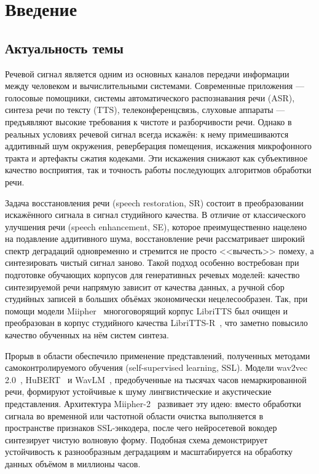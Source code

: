 \section{Введение}
\label{sec:Chapter0} 

\subsection{Актуальность темы}

Речевой сигнал является одним из основных каналов передачи информации между
человеком и вычислительными системами. Современные приложения --- голосовые
помощники, системы автоматического распознавания речи (ASR), синтеза речи по
тексту (TTS), телеконференцсвязь, слуховые аппараты --- предъявляют высокие
требования к чистоте и разборчивости речи. Однако в реальных условиях речевой
сигнал всегда искажён: к нему примешиваются аддитивный шум окружения,
реверберация помещения, искажения микрофонного тракта и артефакты сжатия
кодеками. Эти искажения снижают как субъективное качество восприятия, так и
точность работы последующих алгоритмов обработки речи.

Задача восстановления речи (speech restoration, SR) состоит в преобразовании
искажённого сигнала в сигнал студийного качества. В отличие от классического
улучшения речи (speech enhancement, SE), которое преимущественно нацелено на
подавление аддитивного шума, восстановление речи рассматривает широкий спектр
деградаций одновременно и стремится не просто <<вычесть>> помеху, а
синтезировать чистый сигнал заново. Такой подход особенно востребован при
подготовке обучающих корпусов для генеративных речевых моделей: качество
синтезируемой речи напрямую зависит от качества данных, а ручной сбор
студийных записей в больших объёмах экономически нецелесообразен. Так, при
помощи модели Miipher~\cite{miipher1} многоговорящий корпус LibriTTS был
очищен и преобразован в корпус студийного качества LibriTTS-R~\cite{librittsr},
что заметно повысило качество обученных на нём систем синтеза.

Прорыв в области обеспечило применение представлений, полученных методами
самоконтролируемого обучения (self-supervised learning, SSL). Модели wav2vec
2.0~\cite{wav2vec2}, HuBERT~\cite{hubert} и WavLM~\cite{wavlm}, предобученные
на тысячах часов немаркированной речи, формируют устойчивые к шуму
лингвистические и акустические представления. Архитектура
Miipher-2~\cite{miipher2} развивает эту идею: вместо обработки сигнала во
временной или частотной области очистка выполняется в пространстве признаков
SSL-энкодера, после чего нейросетевой вокодер синтезирует чистую волновую
форму. Подобная схема демонстрирует устойчивость к разнообразным деградациям
и масштабируется на обработку данных объёмом в миллионы часов.

